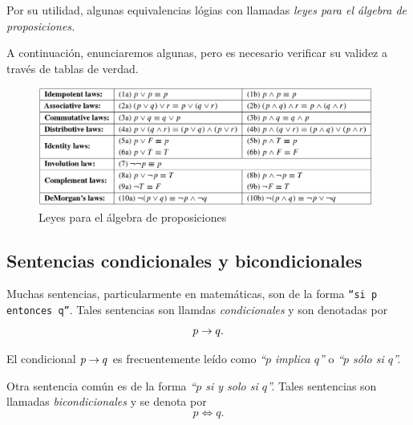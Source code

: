 \documentclass[xcolor={svgnames},
  hyperref={colorlinks}, 
  spanish, 12pt]{beamer}
\numberwithin{equation}{section} %
\numberwithin{figure}{section} %
\begin{document}
\begin{frame}
 Por su utilidad, algunas equivalencias l\'ogias con llamadas \emph{leyes para el \'algebra de proposiciones.}
 \pause
 
 A continuaci\'on, enunciaremos algunas, pero es necesario verificar su validez a trav\'es de tablas de verdad. 
\end{frame}

\begin{frame}
 \begin{figure}
 \centering
 \includegraphics[width=11cm,keepaspectratio=true]{./tabla_4-1.png}
 \caption{Leyes para el álgebra de proposiciones}
 \label{fig:tabla:4.1}
\end{figure}

\end{frame}

\subsection{Sentencias condicionales y bicondicionales}

\begin{frame}
 Muchas sentencias, particularmente en matem\'aticas, son de la forma \texttt{``si $p$ entonces $q$''}. \pause Tales sentencias son llamdas \emph{condicionales} y son denotadas por 
 $$
 p \rightarrow q.
 $$ 
\end{frame}

\begin{frame}
 El condicional $p \rightarrow q$ es frecuentemente le\'ido como \emph{``$p$ implica $q$''} o \emph{``$p$ s\'olo si $q$''.}
\end{frame}

\begin{frame}
 Otra sentencia com\'un es de la forma \emph{``$p$ si y solo si $q$''.} \pause Tales sentencias son llamadas \emph{bicondicionales} y se denota por 
 $$
 p \iff q.
 $$
\end{frame}
\end{document}

